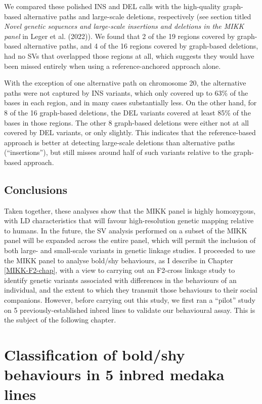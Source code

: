 \documentclass[
]{book}
\begin{document}
We compared these polished INS and DEL calls with the high-quality graph-based alternative paths and large-scale deletions, respectively (see section titled \emph{Novel genetic sequences and large-scale insertions and deletions in the MIKK panel} in Leger et al. (2022)). We found that 2 of the 19 regions covered by graph-based alternative paths, and 4 of the 16 regions covered by graph-based deletions, had no SVs that overlapped those regions at all, which suggests they would have been missed entirely when using a reference-anchored approach alone.

With the exception of one alternative path on chromosome 20, the alternative paths were not captured by INS variants, which only covered up to 63\% of the bases in each region, and in many cases substantially less. On the other hand, for 8 of the 16 graph-based deletions, the DEL variants covered at least 85\% of the bases in those regions. The other 8 graph-based deletions were either not at all covered by DEL variants, or only slightly. This indicates that the reference-based approach is better at detecting large-scale deletions than alternative paths (``insertions''), but still misses around half of such variants relative to the graph-based approach.

\hypertarget{conclusions}{%
\section{Conclusions}\label{conclusions}}

Taken together, these analyses show that the MIKK panel is highly homozygous, with LD characteristics that will favour high-resolution genetic mapping relative to humans. In the future, the SV analysis performed on a subset of the MIKK panel will be expanded across the entire panel, which will permit the inclusion of both large- and small-scale variants in genetic linkage studies. I proceeded to use the MIKK panel to analyse bold/shy behaviours, as I describe in Chapter \ref{MIKK-F2-chap}, with a view to carrying out an F2-cross linkage study to identify genetic variants associated with differences in the behaviours of an individual, and the extent to which they transmit those behaviours to their social companions. However, before carrying out this study, we first ran a ``pilot'' study on 5 previously-established inbred lines to validate our behavioural assay. This is the subject of the following chapter.

\hypertarget{Pilot-chap}{%
\chapter{Classification of bold/shy behaviours in 5 inbred medaka lines}\label{Pilot-chap}}
\end{document}
